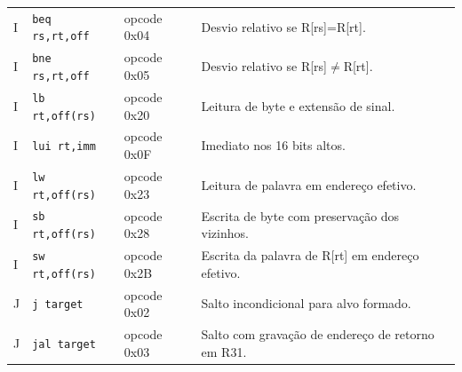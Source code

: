 \begin{longtable}{@{}p{1.42cm}p{3.45cm}p{2.25cm}p{6.93cm}@{}}
I & \texttt{beq rs,rt,off} & opcode 0x04 & Desvio relativo se R[rs]=R[rt]. \\
I & \texttt{bne rs,rt,off} & opcode 0x05 & Desvio relativo se R[rs]$\ne$R[rt]. \\
I & \texttt{lb rt,off(rs)} & opcode 0x20 & Leitura de byte e extensão de sinal. \\
I & \texttt{lui rt,imm} & opcode 0x0F & Imediato nos 16 bits altos. \\
I & \texttt{lw rt,off(rs)} & opcode 0x23 & Leitura de palavra em endereço efetivo. \\
I & \texttt{sb rt,off(rs)} & opcode 0x28 & Escrita de byte com preservação dos vizinhos. \\
I & \texttt{sw rt,off(rs)} & opcode 0x2B & Escrita da palavra de R[rt] em endereço efetivo. \\
J & \texttt{j target} & opcode 0x02 & Salto incondicional para alvo formado. \\
J & \texttt{jal target} & opcode 0x03 & Salto com gravação de endereço de retorno em R31. \\
\end{longtable}
\normalsize
